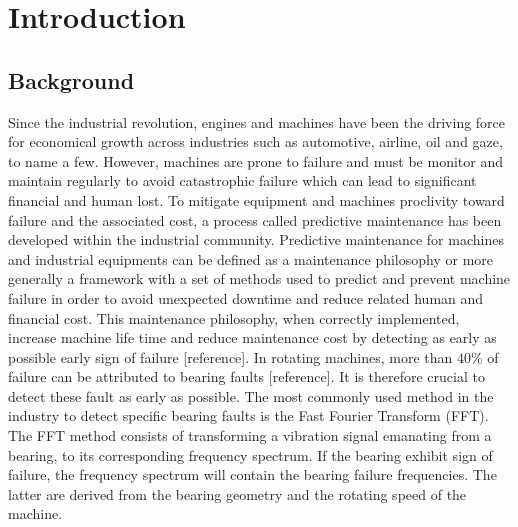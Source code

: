 \documentclass[../Main/thesis.tex]{subfiles}
\begin{document}
\chapter{Introduction}
\label{ch:introduction}

\section{Background}
\label{sec:background}
Since the industrial revolution, engines and machines have been the driving force for economical growth across industries such as automotive, airline, oil and gaze, to name a few. However, machines are prone to failure and must be monitor and maintain regularly to avoid catastrophic failure which can lead to significant financial and human lost. To mitigate equipment and machines proclivity toward failure and the associated cost, a process called predictive maintenance has been developed within the industrial community. Predictive maintenance  for machines and industrial equipments can be defined as a maintenance philosophy or more generally a framework with a set of methods used to predict and prevent machine failure in order to avoid unexpected downtime and reduce related human and financial cost. This maintenance philosophy, when correctly implemented, increase machine life time and reduce maintenance cost by detecting as early as possible early sign of failure [reference].
\justify
In rotating machines, more than $40 \% $ of failure can be attributed to bearing faults [reference]. It is therefore crucial to detect these fault as early as possible. The most commonly used method in the industry to detect specific bearing faults is the Fast Fourier Transform (FFT). The FFT method consists of transforming a vibration signal emanating from a bearing, to its corresponding frequency spectrum. If the bearing exhibit sign of failure, the frequency spectrum will contain the bearing failure frequencies. The latter are derived from the bearing geometry and the rotating speed of the machine.
\end{document}
